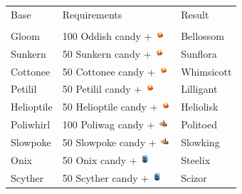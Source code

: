 \begin{table}[ht]
\begin{center}
  \begin{tabular}{lll}
    Base & Requirements & Result \\
    \Midrule \\
    Gloom & 100 Oddish candy + \includegraphics[width=1em,height=1em]{images/sunstone.png} & Bellossom \\
    Sunkern & 50 Sunkern candy + \includegraphics[width=1em,height=1em]{images/sunstone.png} & Sunflora \\
    Cottonee & 50 Cottonee candy + \includegraphics[width=1em,height=1em]{images/sunstone.png} & Whimsicott \\
    Petilil & 50 Petilil candy + \includegraphics[width=1em,height=1em]{images/sunstone.png} & Lilligant \\
    Helioptile & 50 Helioptile candy + \includegraphics[width=1em,height=1em]{images/sunstone.png} & Heliolisk \\
    Poliwhirl & 100 Poliwag candy + \includegraphics[width=1em,height=1em]{images/kingsrock.png} & Politoed \\
    Slowpoke & 50 Slowpoke candy + \includegraphics[width=1em,height=1em]{images/kingsrock.png} & Slowking \\
    Onix & 50 Onix candy + \includegraphics[width=1em,height=1em]{images/metalcoat.png} & Steelix \\
    Scyther & 50 Scyther candy + \includegraphics[width=1em,height=1em]{images/metalcoat.png} & Scizor \\

\end{tabular}
\end{center}
\end{table}
